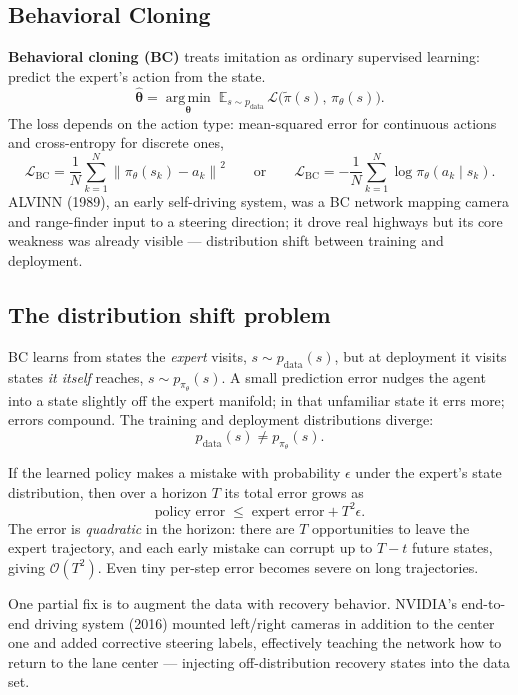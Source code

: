 \documentclass[11pt, oneside]{book}
\newcommand{\E}{\mathbb{E}}              %
\newcommand{\argmin}{\operatorname*{arg\,min}}
\newcommand{\norm}[1]{\left\lVert #1 \right\rVert}
\newcommand{\loss}{\mathcal{L}}          %
\newcommand{\params}{\boldsymbol{\theta}}   %
\newcommand{\bigO}[1]{\mathcal{O}\!\left(#1\right)}
\begin{document}
\subsection{Behavioral Cloning}

\textbf{Behavioral cloning (BC)} treats imitation as ordinary supervised learning:
predict the expert's action from the state.
\[
  \hat{\params} = \argmin_{\params}\; \E_{s \sim p_{\text{data}}}\,
    \loss\bigl(\tilde\pi(s),\, \pi_\theta(s)\bigr).
\]
The loss depends on the action type: mean-squared error for continuous actions and
cross-entropy for discrete ones,
\[
  \loss_{\text{BC}} = \frac{1}{N}\sum_{k=1}^N \norm{\pi_\theta(s_k) - a_k}^2
  \qquad\text{or}\qquad
  \loss_{\text{BC}} = -\frac{1}{N}\sum_{k=1}^N \log \pi_\theta(a_k \mid s_k).
\]
ALVINN (1989), an early self-driving system, was a BC network mapping camera and
range-finder input to a steering direction; it drove real highways but its core
weakness was already visible --- distribution shift between training and deployment.

\subsection{The distribution shift problem}

BC learns from states the \emph{expert} visits, $s \sim p_{\text{data}}(s)$, but at
deployment it visits states \emph{it itself} reaches, $s \sim p_{\pi_\theta}(s)$.
A small prediction error nudges the agent into a state slightly off the expert manifold;
in that unfamiliar state it errs more; errors compound. The training and deployment
distributions diverge:
\[
  p_{\text{data}}(s) \neq p_{\pi_\theta}(s).
\]

\begin{thmbox}[title={Compounding errors (Ross \& Bagnell, 2010)}]
If the learned policy makes a mistake with probability $\epsilon$ under the expert's
state distribution, then over a horizon $T$ its total error grows as
\[
  \text{policy error} \;\le\; \text{expert error} + T^2\epsilon.
\]
The error is \emph{quadratic} in the horizon: there are $T$ opportunities to leave the
expert trajectory, and each early mistake can corrupt up to $T-t$ future states, giving
$\bigO{T^2}$. Even tiny per-step error becomes severe on long trajectories.
\end{thmbox}

One partial fix is to augment the data with recovery behavior. NVIDIA's end-to-end
driving system (2016) mounted left/right cameras in addition to the center one and added
corrective steering labels, effectively teaching the network how to return to the lane
center --- injecting off-distribution recovery states into the data set.
\end{document}
